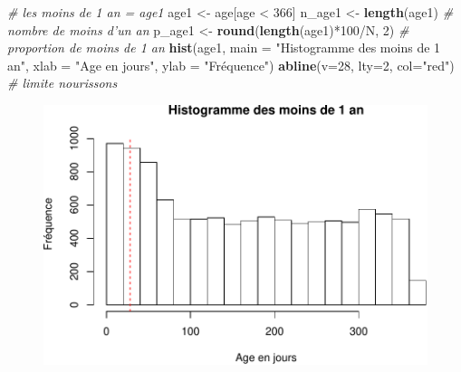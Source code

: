 \documentclass[]{article}
\newenvironment{Shaded}{\begin{snugshade}}{\end{snugshade}}
\newcommand{\KeywordTok}[1]{\textcolor[rgb]{0.13,0.29,0.53}{\textbf{{#1}}}}
\newcommand{\DataTypeTok}[1]{\textcolor[rgb]{0.13,0.29,0.53}{{#1}}}
\newcommand{\DecValTok}[1]{\textcolor[rgb]{0.00,0.00,0.81}{{#1}}}
\newcommand{\StringTok}[1]{\textcolor[rgb]{0.31,0.60,0.02}{{#1}}}
\newcommand{\CommentTok}[1]{\textcolor[rgb]{0.56,0.35,0.01}{\textit{{#1}}}}
\newcommand{\NormalTok}[1]{{#1}}
\begin{document}
\begin{Shaded}
\begin{Highlighting}[]
\CommentTok{# les moins de 1 an = age1}
\NormalTok{age1 <-}\StringTok{ }\NormalTok{age[age <}\StringTok{ }\DecValTok{366}\NormalTok{]}
\NormalTok{n_age1 <-}\StringTok{ }\KeywordTok{length}\NormalTok{(age1) }\CommentTok{# nombre de moins d'un an}
\NormalTok{p_age1 <-}\StringTok{ }\KeywordTok{round}\NormalTok{(}\KeywordTok{length}\NormalTok{(age1)*}\DecValTok{100}\NormalTok{/N, }\DecValTok{2}\NormalTok{) }\CommentTok{# proportion de moins de 1 an}
\KeywordTok{hist}\NormalTok{(age1, }\DataTypeTok{main =} \StringTok{"Histogramme des moins de 1 an"}\NormalTok{, }\DataTypeTok{xlab =} \StringTok{"Age en jours"}\NormalTok{, }\DataTypeTok{ylab =} \StringTok{"Fréquence"}\NormalTok{)}
\KeywordTok{abline}\NormalTok{(}\DataTypeTok{v=}\DecValTok{28}\NormalTok{, }\DataTypeTok{lty=}\DecValTok{2}\NormalTok{, }\DataTypeTok{col=}\StringTok{"red"}\NormalTok{) }\CommentTok{# limite nourissons}
\end{Highlighting}
\end{Shaded}

\begin{figure}[htbp]
\centering
\includegraphics{./age_files/figure-latex/ped-2.pdf}
\end{figure}
\end{document}
